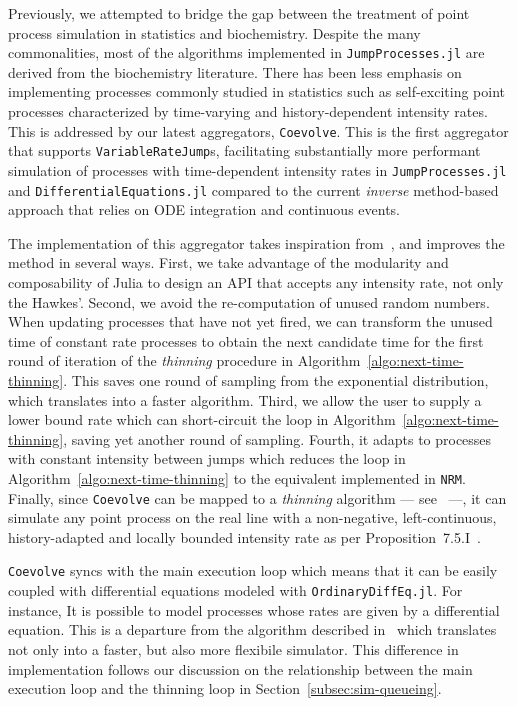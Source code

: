 \documentclass{juliacon}
\begin{document}
Previously, we attempted to bridge the gap between the treatment of point process simulation in statistics and biochemistry. Despite the many commonalities, most of the algorithms implemented in \texttt{JumpProcesses.jl} are derived from the biochemistry literature. There has been less emphasis on implementing processes commonly studied in statistics such as self-exciting point processes characterized by time-varying and history-dependent intensity rates. This is addressed by our latest aggregators, \texttt{Coevolve}. This is the first aggregator that supports \texttt{VariableRateJump}s, facilitating substantially more performant simulation of processes with time-dependent intensity rates in \texttt{JumpProcesses.jl} and \texttt{DifferentialEquations.jl} compared to the current \textit{inverse} method-based approach that relies on ODE integration and continuous events. 

The implementation of this aggregator takes  inspiration from~\cite{farajtabar2017}, and improves the method in several ways. First, we take advantage of the modularity and composability of Julia to design an API that accepts any intensity rate, not only the Hawkes'. Second, we avoid the re-computation of unused random numbers. When updating processes that have not yet fired, we can transform the unused time of constant rate processes to obtain the next candidate time for the first round of iteration of the \textit{thinning} procedure in Algorithm~\ref{algo:next-time-thinning}. This saves one round of sampling from the exponential distribution, which translates into a faster algorithm. Third, we allow the user to supply a lower bound rate which can short-circuit the loop in Algorithm~\ref{algo:next-time-thinning}, saving yet another round of sampling. Fourth, it adapts to processes with constant intensity between jumps which reduces the loop in Algorithm~\ref{algo:next-time-thinning} to the equivalent implemented in \texttt{NRM}. Finally, since \texttt{Coevolve} can be mapped to a \textit{thinning} algorithm --- see~\cite{farajtabar2017} ---, it can simulate any point process on the real line with a non-negative, left-continuous, history-adapted and locally bounded intensity rate as per Proposition~7.5.I~\cite{daley2003}.

\texttt{Coevolve} syncs with the main execution loop which means that it can be easily coupled with differential equations modeled with \texttt{OrdinaryDiffEq.jl}. For instance, It is possible to model processes whose rates are given by a differential equation. This is a departure from the algorithm described in~\cite{farajtabar2017} which translates not only into a faster, but also more flexibile simulator. This difference in implementation follows our discussion on the relationship between the main execution loop and the thinning loop in Section~\ref{subsec:sim-queueing}.
\end{document}

